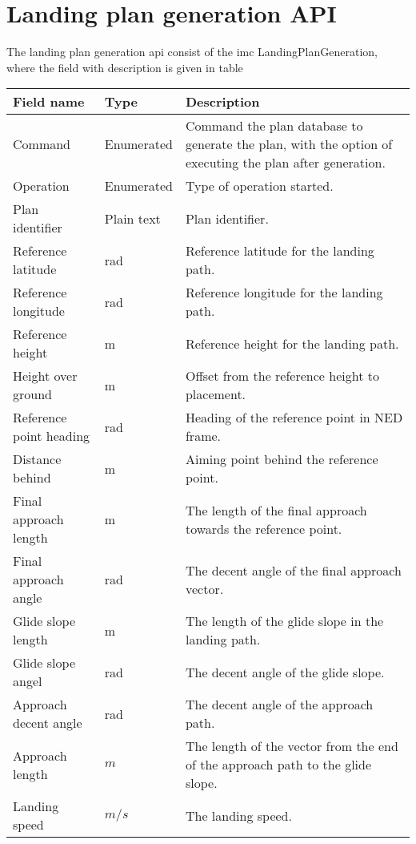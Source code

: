 \chapter{Landing plan generation API}\label{AP:APIIMC}
The landing plan generation \gls{api} consist of the \gls{imc} LandingPlanGeneration, where the field with description is given in table 
\begin{table}
\centering
\begin{tabular}{| p{4cm} | p{2cm} | p{6cm} |}
\hline
\textbf{Field name}	& \textbf{Type}	& \textbf{Description} \\ \hline
Command								& Enumerated	& Command the plan database to generate the plan, with the option of executing the plan after generation. \\ \hline
Operation							& Enumerated	& Type of operation started.	\\ \hline
Plan identifier						& Plain text	& Plan identifier.	\\ \hline
Reference latitude					& rad			& Reference latitude for the landing path.	\\ \hline
Reference longitude					& rad			& Reference longitude for the landing path.	\\ \hline
Reference height					& m				& Reference height for the landing path.	\\ \hline
Height over ground					& m				& Offset from the reference height to placement.	\\ \hline
Reference point heading				& rad			& Heading of the reference point in NED frame.	\\ \hline
Distance behind						& m				& Aiming point behind the reference point.	\\ \hline
Final approach length				& m				& The length of the final approach towards the reference point.	\\ \hline
Final approach angle				& rad			& The decent angle of the final approach vector. 	\\ \hline
Glide slope length					& m				& The length of the glide slope in the landing path.	\\ \hline
Glide slope angel					& rad			& The decent angle of the glide slope.	\\ \hline
Approach decent angle				& rad			& The decent angle of the approach path.	\\ \hline
Approach length						& $m$			& The length of the vector from the end of the approach path to the glide slope.	\\ \hline
Landing speed						& $m/s$			& The landing speed.	\\ \hline

\end{tabular}
\end{table}
